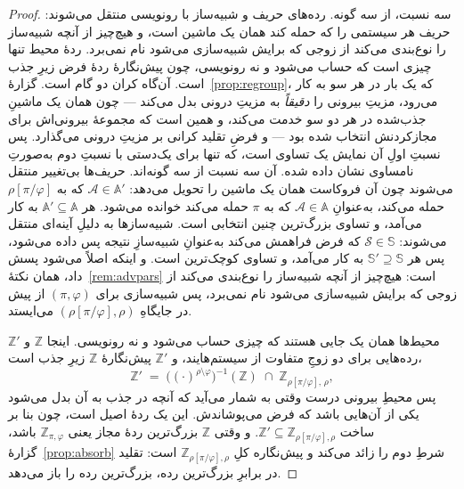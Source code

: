 \documentclass[10pt,oneside,openany]{book}
\newcommand{\Adv}{\mathcal{A}}
\newcommand{\Sim}{\mathcal{S}}
\newcommand{\Aset}{\mathbb{A}}
\newcommand{\SimSet}{\mathbb{S}}
\newcommand{\ZenvSet}{\mathbb{Z}}
\theoremstyle{accentdef}
\theoremstyle{accentplain}
\begin{document}
\begin{proof}
سه نسبت، از سه گونه. رده‌های حریف و شبیه‌ساز با رونویسی منتقل می‌شوند:
حریف هر سیستمی را که حمله کند همان یک ماشین است، و هیچ‌چیز از آنچه
شبیه‌ساز را نوع‌بندی می‌کند از زوجی که برایش شبیه‌سازی می‌شود نام
نمی‌برد. ردهٔ محیط تنها چیزی است که حساب می‌شود و نه رونویسی، چون پیش‌نگارهٔ
ردهٔ فرض زیرِ جذب است. آن‌گاه کران دو گام است.
گزارهٔ~\ref{prop:regroup}، که یک بار در هر سو به کار می‌رود، مزیتِ بیرونی
را \emph{دقیقاً} به مزیتِ درونی بدل می‌کند --- چون همان یک ماشینِ جذب‌شده
در هر دو سو خدمت می‌کند، و همین است که مجموعهٔ بیرونی‌اش برای مجازکردنش
انتخاب شده بود --- و فرضِ تقلید کرانی بر مزیتِ درونی می‌گذارد. پس نسبتِ
اولِ آن نمایش یک تساوی است، که تنها برای یک‌دستی با نسبتِ دوم به‌صورتِ
نامساوی نشان داده شده.
آن سه نسبت از سه گونه‌اند. حریف‌ها بی‌تغییر منتقل می‌شوند چون آن فروکاست
همان یک ماشین را تحویل می‌دهد: $\Adv \in \Aset'$ که به $\rho[\pi/\varphi]$
حمله می‌کند، به‌عنوانِ $\Adv \in \Aset$ که به $\pi$ حمله می‌کند خوانده
می‌شود. هر $\Aset' \subseteq \Aset$ به کار می‌آمد، و تساوی بزرگ‌ترین چنین
انتخابی است. شبیه‌سازها به دلیلِ آینه‌ای منتقل می‌شوند: $\Sim \in \SimSet$
که فرض فراهمش می‌کند به‌عنوانِ شبیه‌سازِ نتیجه پس داده می‌شود، پس هر
$\SimSet' \supseteq \SimSet$ به کار می‌آمد، و تساوی کوچک‌ترین است. و اینکه
اصلاً می‌شود پسش داد، همان نکتهٔ~\ref{rem:advpars} است: هیچ‌چیز از آنچه
شبیه‌ساز را نوع‌بندی می‌کند از زوجی که برایش شبیه‌سازی می‌شود نام نمی‌برد،
پس شبیه‌سازی برای $(\pi,\varphi)$ از پیش در جایگاهِ
$(\rho[\pi/\varphi],\rho)$ می‌ایستد.

محیط‌ها همان یک جایی هستند که چیزی حساب می‌شود و نه رونویسی. اینجا
$\ZenvSet$ و $\ZenvSet'$ رده‌هایی برای دو زوجِ متفاوت از سیستم‌هایند، و
$\ZenvSet'$ پیش‌نگارهٔ $\ZenvSet$ زیرِ جذب است،
\[
  \ZenvSet' \;=\; \bigl((\cdot)^{\rho \setminus \varphi}\bigr)^{-1}(\ZenvSet) \;\cap\; \ZenvSet_{\rho[\pi/\varphi],\,\rho} ,
\]
پس محیطِ بیرونی درست وقتی به شمار می‌آید که آنچه در جذب به آن بدل می‌شود
یکی از آن‌هایی باشد که فرض می‌پوشاندش. این یک ردهٔ اصیل است، چون بنا بر
ساخت $\ZenvSet' \subseteq \ZenvSet_{\rho[\pi/\varphi],\rho}$. و وقتی
$\ZenvSet$ بزرگ‌ترین ردهٔ مجاز یعنی $\ZenvSet_{\pi,\varphi}$ باشد،
گزارهٔ~\ref{prop:absorb} شرطِ دوم را زائد می‌کند و پیش‌نگاره کلِ
$\ZenvSet_{\rho[\pi/\varphi],\rho}$ است: تقلید در برابرِ بزرگ‌ترین رده،
بزرگ‌ترین رده را باز می‌دهد.


\end{proof}
\end{document}
